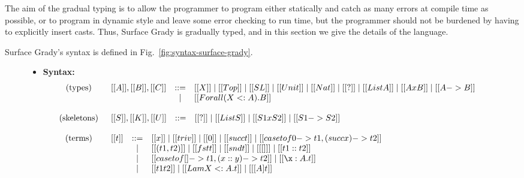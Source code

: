 The aim of the gradual typing is to allow the programmer to program
either statically and catch as many errors at compile time as
possible, or to program in dynamic style and leave some error checking
to run time, but the programmer should not be burdened by having to
explicitly insert casts.  Thus, Surface Grady is gradually typed, and
in this section we give the details of the language.

Surface Grady's syntax is defined in
Fig.~\ref{fig:syntax-surface-grady}.  
\begin{figure}
  \small
  \begin{mdframed}
    \begin{itemize}
    \item[] \textbf{Syntax:}
      \[
      \begin{array}{cl}
        \begin{array}{l}
          \text{(types)}\\\\
        \end{array}     &
        \begin{array}{lcl}
          [[A]],[[B]],[[C]] & ::= & [[X]] \mid [[Top]] \mid [[SL]] \mid [[Unit]] \mid [[Nat]] \mid [[?]] \mid [[List A]] \mid [[A x B]] \mid [[A -> B]] \\ & \mid &[[Forall (X <: A).B]]\\
        \end{array}\\\\
        
        \text{(skeletons)} &
        \begin{array}{lcl}
          [[S]],[[K]],[[U]] & ::= & [[?]] \mid [[List S]] \mid [[S1 x S2]] \mid [[S1 -> S2]]\\
        \end{array}\\\\
        
        \begin{array}{l}
          \text{(terms)}\\\\\\\\
        \end{array}     &
        \begin{array}{lcl}
          [[t]] & ::= & [[x]] \mid [[triv]] \mid [[0]] \mid [[succ t]] \mid [[case t of 0 -> t1, (succ x) -> t2]] \\ & \mid & [[(t1 , t2)]] \mid [[fst t]] \mid [[snd t]] \mid [[ [] ]] \mid [[t1 :: t2]] \\ & \mid & [[case t of [] -> t1, (x :: y) -> t2]] \mid [[\x : A.t]] \\ & \mid & [[t1 t2]] \mid [[Lam X <: A.t]] \mid [[ [ A ] t ]]\\
        \end{array}\\\\
        

\end{array}\]
\end{itemize}
\end{mdframed}
\end{figure}
